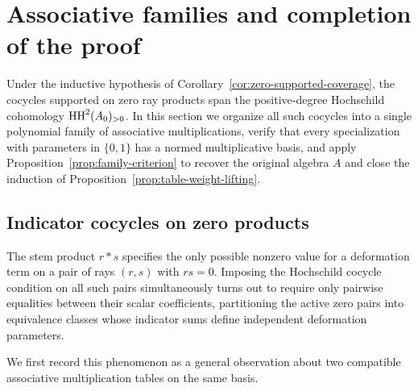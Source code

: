 \section{Associative families and completion of the proof}
\label{sec:binary-families}

Under the inductive hypothesis of Corollary~\ref{cor:zero-supported-coverage}, the cocycles supported on zero ray products span the positive-degree Hochschild cohomology $\operatorname{HH}^2(A_0)_{>0}$. In this section we organize all such cocycles into a single polynomial family of associative multiplications, verify that every specialization with parameters in $\{0,1\}$ has a normed multiplicative basis, and apply Proposition~\ref{prop:family-criterion} to recover the original algebra $A$ and close the induction of Proposition~\ref{prop:table-weight-lifting}.

\subsection{Indicator cocycles on zero products}
\label{subsec:binary-families}

The stem product $r*s$ specifies the only possible nonzero value for a deformation term on a pair of rays $(r,s)$ with $rs=0$. Imposing the Hochschild cocycle condition on all such pairs simultaneously turns out to require only pairwise equalities between their scalar coefficients, partitioning the active zero pairs into equivalence classes whose indicator sums define independent deformation parameters.

We first record this phenomenon as a general observation about two compatible associative multiplication tables on the same basis.

